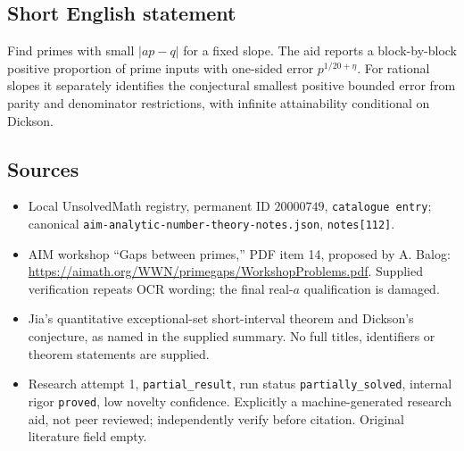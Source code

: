 \documentclass[11pt]{article}
\begin{document}
\subsection{Short English statement}
Find primes with small $|ap-q|$ for a fixed slope. The aid reports a block-by-block positive proportion of prime inputs with one-sided error $p^{1/20+\eta}$. For rational slopes it separately identifies the conjectural smallest positive bounded error from parity and denominator restrictions, with infinite attainability conditional on Dickson.
\subsection{Sources}
\begin{itemize}
\item Local UnsolvedMath registry, permanent ID $20000749$, \texttt{catalogue entry}; canonical \texttt{aim-analytic-number-theory-notes.json}, \texttt{notes[112]}.
\item AIM workshop ``Gaps between primes,'' PDF item 14, proposed by A. Balog: \url{https://aimath.org/WWN/primegaps/WorkshopProblems.pdf}. Supplied verification repeats OCR wording; the final real-$a$ qualification is damaged.
\item Jia's quantitative exceptional-set short-interval theorem and Dickson's conjecture, as named in the supplied summary. No full titles, identifiers or theorem statements are supplied.
\item Research attempt 1, \texttt{partial\_result}, run status \texttt{partially\_solved}, internal rigor \texttt{proved}, low novelty confidence. Explicitly a machine-generated research aid, not peer reviewed; independently verify before citation. Original literature field empty.
\end{itemize}
\end{document}

